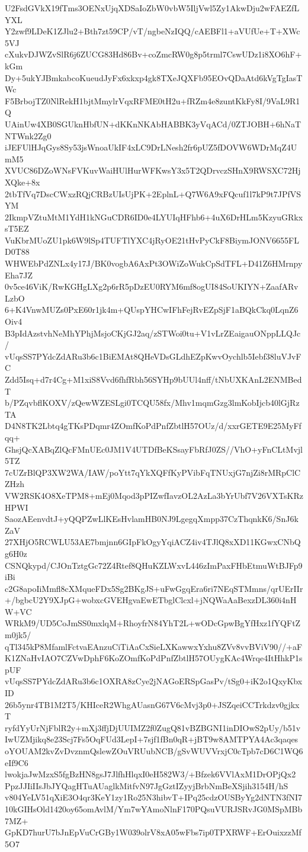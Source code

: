 U2FsdGVkX19fTms3OENxUjqXDSaIoZbW0vbW5IljVwl5Zy1AkwDju2wFAEZfLYXL
Y2zwf9LDeK1ZJlu2+Bth7zt59CP/vT/ngbeNzIQQ/cAEBFl1+aVUfUe+T+XWc5VJ
cXukvDJWZvSlR6j6ZUCG83Hd86Bv+coZmcRW0g8p5trml7CswUDz1i8XO6hF+kGm
Dy+5ukYJBmkabcoKueudJyFx6xkxp4gk8TXeJQXFb95EOvQDaAtd6kVgTgIasTWc
F5BrbojTZ0NlRekH1bjtMmylrVqxRFME0tH2u+fRZm4e8zuntKkFy8I/9VaL9R1Q
UAinUw4XB0SGUknHbfUN+dKKnNKAbHABBK3yVqACd/0ZTJOBH+6hNaTNTWnk2Zg0
iJEFUlHJqGys8Sy53jsWnoaUkIF4xLC9DrLNesh2fr6pUZ5fDOVW6WDrMqZ4UmM5
XVUC86DZoWNsFVKuvWaiHUlHurWFKwsY3x5T2QDrvczSHnX9RWSXC72HjXQke+8x
2tbTfVq7DscCWxzRQjCRBzUIsUjPK+2EplnL+Q7W6A9xFQcuf1l7kP9t7JPfVSYM
2IkmpVZtuMtM1YdH1kNGuCDR6ID0e4LYUIqHFhb6+4uX6DrHLm5KzyuGRkxsT5EZ
VuKbrMUoZU1pk6W9lSp4TUFTlYXC4jRyOE21tHvPyCkF8BiymJONV6655FLD0T88
WHWEbPdZNLx4y17J/BK0vogbA6AxPt3OWiZoWukCpSdTFL+D41Z6HMrnpyEha7JZ
0v5ce46ViK/RwKGHgLXg2p6rR5pDzEU0RYM6mf8ogUI84SoUKIYN+ZaafARvLzbO
6+K4VnwMUZs0PxE60r1jk4m+QUspYHCwIFhFejRvEZpSjF1aBQkCkq0LqnZ6Oiv4
B3pIdAzstvhNeMhYPhjMsjoCKjGJ2aq/zSTWoi0tu+V1vLrZEaigauONppLLQJc/
vUqsSS7PYdcZdARu3b6c1BiEMAt8QHeVDsGLdhEZpKwvOychlb5Iebf38luVJvFC
Zdd5Isq+d7r4Cg+M1xiS8Vvd6fhfRbh56SYHp9bUUl4nff/tNbUXKAnL2ENMBedT
b/PZqvbflKOXV/zQewWZESLgi0TCQU58fx/Mhv1mqmGzg3lmKobIjcb40lGjRzTA
D4N8TK2Lbtq4gTKsPDqmr4ZOmfKoPdPnfZbtlH57OUz/d/xxrGETE9E25MyFfqq+
GhsjQcXABqZlQcFMnUEc0JM1V4UTDfBeKSsayFbRfJ0ZS//VhO+yFnCLtMvjl5TZ
7cUZrBlQP3XW2WA/IAW/poYtt7qYkXQFfKyPVibFqTNUxjG7njZi8rMRpClCZHzh
VW2RSK4O8XeTPM8+mEj0Mqod3pPIZwfIavzOL2AzLa3bYrUbf7V26VXTsKRzHPWI
SaozAEenvdtJ+yQQPZwLlKEsHvlamHB0NJ9LgegqXmpp37CzThqnkK6/SnJ6kZaV
27XHjO5RCWLU53AE7bmjnn6GIpFkOgyYqiACZ4iv4TJlQ8xXD11KGwxCNbQg6H0z
CSNQkypd/CJOnTztgGc72Z4Rtef8QHuKZLWxvL446zImPaxFHbEtmuWtBJFp9iBi
c2G8apoIiMmfl8cXMqueFDx5Sg2BKgJS+uFwGgqEra6ri7NEqSTMmns/qrUErIIr
+/bgbcU2Y9XJpG+wobxcGVEHgvaEwETbglClcxl+jNQWaAaBexzDL360i4nHW+VC
WRkM9/UD5CoJmSS0mxlqM+RhoyfrN84YhT2L+wODcGpwBgYfHxz1fYQFtZm0jk5/
qTl345kP8MfamlFctvaEAnzuCiTiAaCxSieLXKawwxYxhu8ZVv8vvBViV90//+aF
K1ZNaHvIAO7CZVwDphF6KoZOmfKoPdPnfZbtlH57OUygKAc4Wrqe4ItHhkP1spUF
vUqsSS7PYdcZdARu3b6c1OXRA8zCye2jNAGoERSpGasPv/tSg0+iK2o1QxyKbxID
26b5ynr4TB1M2T5/KHIceR2WhgAUasnG67V6cMvj3p0+JSZqeiCCTrkdzv0gjkxT
ryfdYyUrNjFblR2y+mXj3ffjDjUUIMZ2f0ZugQ81vBZBGNI1inDIOwS2pUy/b51v
IwUZMjikq8e23Scj7Fs5OqFUd3LepI+7sjf1fBn0qR+jBT9w8AMTPYA4Ac3qaqes
oYOUAM2kvZvDvznmQslewZOuVRUubNCB/gSvWUVVrxjC0cTpb7cD6C1WQ6eIf9C6
lwokjaJwMzxS5fgBzHN8gsJ7JlfhHlqxI0eH582W3/+Bfzek6VVlAxM1DrOPjQx2
PpzJJIiIIsJbJYQagHTuAUaglkMitfvN97JgGztIZyyjBrbNmBeXSjih3154H/hS
v804YeLV51qXiE3O4qr3KeY1zy1Ro25N3hibvT+IPq25cdzOUSByYg2dNTN3fNI7
10kGIHsOld1420oy65omAvlM/Ym7wYAmoNlnF170PQsuVURJSRvJG0MSpMBb7MZ+
GpKD7hurU7bJnEpVuCrGBy1W039olrV8xA05wFbs7ip0TPXRWF+ErOuixzzMf5O7
